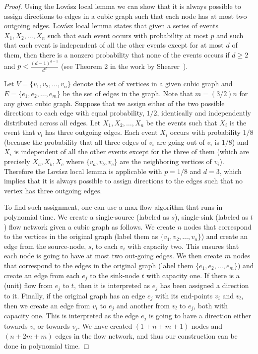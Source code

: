 \begin{proof}
	Using the Lov{\'a}sz local lemma we can show that it is always possible to assign directions to edges in a cubic graph such that each node has at most two outgoing edges. Lov{\'a}sz local lemma states that given a series of events $X_1, X_2, \dots, X_n$ such that each event occurs with probability at most $p$ and such that each event is independent of all the other events except for at most $d$ of them, then there is a nonzero probability that none of the events occurs if $d \geq 2$ and $p < \frac{(d-1)^{d-1}}{d^d}$ (see Theorem 2 in the work by Shearer~\cite{lovasz_local_lemma}).

	Let $V = \{v_1, v_2, \dots, v_n\}$ denote the set of vertices in a given cubic graph and $E = \{e_1, e_2, \dots, e_m\}$ be the set of edges in the graph. Note that $m = (3/2)n$ for any given cubic graph. Suppose that we assign either of the two possible directions to each edge with equal probability, $1/2$, identically and independently distributed across all edges. 
	Let $X_1, X_2, \dots, X_n$ be the events such that $X_i$ is the event that $v_i$ has three outgoing edges.
	Each event $X_i$ occurs with probability $1/8$ (because the probability that all three edges of $v_i$ are going out of $v_i$ is $1/8$) and $X_i$ is independent of all the other events except for the three of them (which are precisely $X_a, X_b, X_c$ where $\{v_a,v_b,v_c\}$ are the neighboring vertices of $v_i$). Therefore the Lov{\'a}sz local lemma is applicable with $p = 1/8$ and $d = 3$, which implies that it is always possible to assign directions to the edges such that no vertex has three outgoing edges. 

	To find such assignment, one can use a max-flow algorithm that runs in polynomial time. We create a single-source (labeled as $s$), single-sink (labeled as $t$) flow network given a cubic graph as follows. We create $n$ nodes that correspond to the vertices in the original graph (label them as $\{v_1, v_2, \dots, v_n\}$) and create an edge from the source-node, $s$, to each $v_i$ with capacity two. This ensures that each node is going to have at most two out-going edges.
	We then create $m$ nodes that correspond to the edges in the original graph (label them $\{e_1, e_2, \dots, e_m\}$) and create an edge from each $e_j$ to the sink-node $t$ with capacity one. If there is a (unit) flow from $e_j$ to $t$, then it is interpreted as $e_j$ has been assigned a direction to it.  
Finally, if the original graph has an edge $e_j$ with its end-points $v_i$ and $v_l$, then we create an edge from $v_i$ to $e_j$ and another from $v_l$ to $e_j$, both with capacity one. This is interpreted as the edge $e_j$ is going to have a direction either towards $v_i$ or towards $v_j$. 
We have created $(1 + n + m + 1)$ nodes and $(n + 2m + m)$ edges in the flow network, and thus our construction can be done in polynomial time.  


\end{proof}
